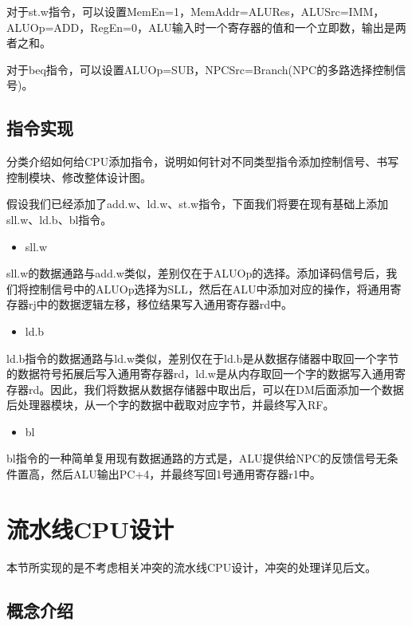 对于st.w指令，可以设置MemEn=1，MemAddr=ALURes，ALUSrc=IMM，ALUOp=ADD，RegEn=0，ALU输入时一个寄存器的值和一个立即数，输出是两者之和。

对于beq指令，可以设置ALUOp=SUB，NPCSrc=Branch(NPC的多路选择控制信号)。

\subsection{指令实现}\label{sec:05-simple-cpu-006}

分类介绍如何给CPU添加指令，说明如何针对不同类型指令添加控制信号、书写控制模块、修改整体设计图。

假设我们已经添加了add.w、ld.w、st.w指令，下面我们将要在现有基础上添加sll.w、ld.b、bl指令。

\begin{itemize}
\tightlist
\item
  sll.w
\end{itemize}

sll.w的数据通路与add.w类似，差别仅在于ALUOp的选择。添加译码信号后，我们将控制信号中的ALUOp选择为SLL，然后在ALU中添加对应的操作，将通用寄存器rj中的数据逻辑左移，移位结果写入通用寄存器rd中。

\begin{itemize}
\tightlist
\item
  ld.b
\end{itemize}

ld.b指令的数据通路与ld.w类似，差别仅在于ld.b是从数据存储器中取回一个字节的数据符号拓展后写入通用寄存器rd，ld.w是从内存取回一个字的数据写入通用寄存器rd。因此，我们将数据从数据存储器中取出后，可以在DM后面添加一个数据后处理器模块，从一个字的数据中截取对应字节，并最终写入RF。

\begin{itemize}
\tightlist
\item
  bl
\end{itemize}

bl指令的一种简单复用现有数据通路的方式是，ALU提供给NPC的反馈信号无条件置高，然后ALU输出PC+4，并最终写回1号通用寄存器r1中。

\section{流水线CPU设计}\label{sec:05-simple-cpu-007}

本节所实现的是不考虑相关冲突的流水线CPU设计，冲突的处理详见后文。

\subsection{概念介绍}\label{sec:05-simple-cpu-008}

